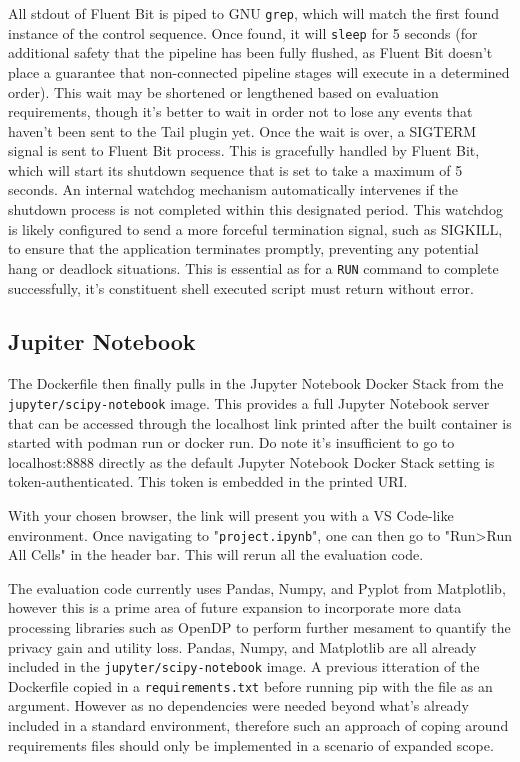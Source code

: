 All stdout of Fluent Bit is piped to GNU \texttt{grep}, which will match the first found instance of the control sequence. Once found, it will \texttt{sleep} for 5 seconds (for additional safety that the pipeline has been fully flushed, as Fluent Bit doesn't place a guarantee that non-connected pipeline stages will execute in a determined order). This wait may be shortened or lengthened based on evaluation requirements, though it's better to wait in order not to lose any events that haven't been sent to the Tail plugin yet. Once the wait is over, a SIGTERM signal is sent to Fluent Bit process. This is gracefully handled by Fluent Bit, which will start its shutdown sequence that is set to take a maximum of 5 seconds. An internal watchdog mechanism automatically intervenes if the shutdown process is not completed within this designated period. This watchdog is likely configured to send a more forceful termination signal, such as SIGKILL, to ensure that the application terminates promptly, preventing any potential hang or deadlock situations. This is essential as for a \texttt{RUN} command to complete successfully, it's constituent shell executed script must return without error.


\subsection{Jupiter Notebook}
The Dockerfile then finally pulls in the Jupyter Notebook Docker Stack from the \texttt{jupyter/scipy-notebook} image. This provides a full Jupyter Notebook server that can be accessed through the localhost link printed after the built container is started with podman run or docker run. Do note it's insufficient to go to localhost:8888 directly as the default Jupyter Notebook Docker Stack setting is token-authenticated. This token is embedded in the printed URI. 

With your chosen browser, the link will present you with a VS Code-like environment. Once navigating to "\texttt{project.ipynb}", one can then go to "Run>Run All Cells" in the header bar. This will rerun all the evaluation code.

The evaluation code currently uses Pandas, Numpy, and Pyplot from Matplotlib, however this is a prime area of future expansion to incorporate more data processing libraries such as OpenDP to perform further mesament to quantify the privacy gain and utility loss. Pandas, Numpy, and Matplotlib are all already included in the \texttt{jupyter/scipy-notebook} image. A previous itteration of the Dockerfile copied in a \texttt{requirements.txt} before running pip with the file as an argument. However as no dependencies were needed beyond what's already included in a standard environment, therefore such an approach of coping around requirements files should only be implemented in a scenario of expanded scope.


